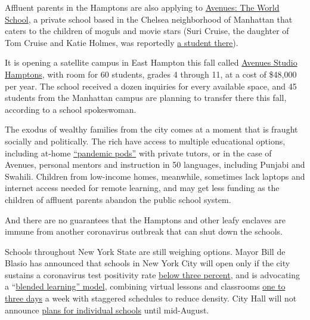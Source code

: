 Affluent parents in the Hamptons are also applying to
\href{https://www.avenues.org/}{Avenues: The World School}, a private
school based in the Chelsea neighborhood of Manhattan that caters to the
children of moguls and movie stars (Suri Cruise, the daughter of Tom
Cruise and Katie Holmes, was reportedly
\href{https://www.businessinsider.com/avenues-world-school-new-york-city-photos-tour-amenities-2019-4}{a
student there}).

It is opening a satellite campus in East Hampton this fall called
\href{https://studio.avenues.org/}{Avenues Studio Hamptons}, with room
for 60 students, grades 4 through 11, at a cost of \$48,000 per year.
The school received a dozen inquiries for every available space, and 45
students from the Manhattan campus are planning to transfer there this
fall, according to a school spokeswoman.

The exodus of wealthy families from the city comes at a moment that is
fraught socially and politically. The rich have access to multiple
educational options, including at-home
\href{https://www.nytimes.com/2020/07/22/parenting/school-pods-coronavirus.html}{``pandemic
pods''} with private tutors, or in the case of Avenues, personal mentors
and instruction in 50 languages, including Punjabi and Swahili. Children
from low-income homes, meanwhile, sometimes lack laptops and internet
access needed for remote learning, and may get less funding as the
children of affluent parents abandon the public school system.

And there are no guarantees that the Hamptons and other leafy enclaves
are immune from another coronavirus outbreak that can shut down the
schools.

Schools throughout New York State are still weighing options. Mayor Bill
de Blasio has announced that schools in New York City will open only if
the city sustains a coronavirus test positivity rate
\href{https://www.nytimes.com/2020/07/31/world/coronavirus-covid-19.html?action=click\&module=Top\%20Stories\&pgtype=Homepage\#link-22c71cd7}{below
three percent}, and is advocating a
``\href{https://www.nytimes.com/2020/07/08/nyregion/nyc-schools-reopening-plan.html}{blended
learning'' model}, combining virtual lessons and classrooms
\href{https://www.nytimes.com/2020/07/08/nyregion/nyc-schools-reopening-plan.html}{one
to three days} a week with staggered schedules to reduce density. City
Hall will not announce
\href{https://www.nbcnewyork.com/news/coronavirus/nyc-to-ask-state-for-extension-on-specific-back-to-school-plans/2540164/}{plans
for individual schools} until mid-August.

